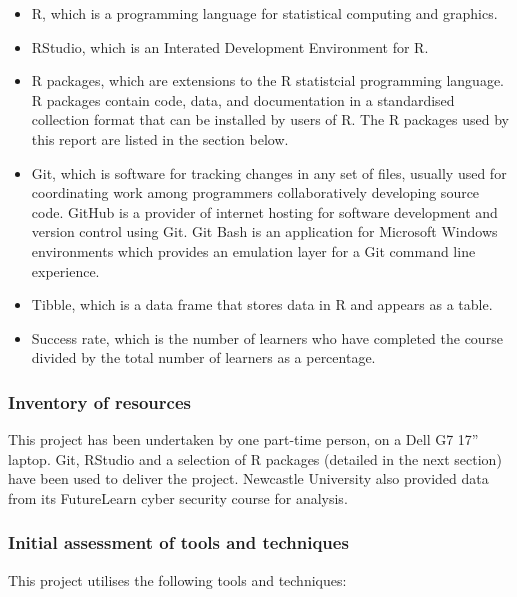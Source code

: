 \documentclass[
]{article}
\begin{document}
\begin{itemize}
\item
  R, which is a programming language for statistical computing and
  graphics.
\item
  RStudio, which is an Interated Development Environment for R.
\item
  R packages, which are extensions to the R statistcial programming
  language. R packages contain code, data, and documentation in a
  standardised collection format that can be installed by users of R.
  The R packages used by this report are listed in the section below.
\item
  Git, which is software for tracking changes in any set of files,
  usually used for coordinating work among programmers collaboratively
  developing source code. GitHub is a provider of internet hosting for
  software development and version control using Git. Git Bash is an
  application for Microsoft Windows environments which provides an
  emulation layer for a Git command line experience.
\item
  Tibble, which is a data frame that stores data in R and appears as a
  table.
\item
  Success rate, which is the number of learners who have completed the
  course divided by the total number of learners as a percentage.
\end{itemize}

\hypertarget{inventory-of-resources}{%
\subsubsection{Inventory of resources}\label{inventory-of-resources}}

This project has been undertaken by one part-time person, on a Dell G7
17'' laptop. Git, RStudio and a selection of R packages (detailed in the
next section) have been used to deliver the project. Newcastle
University also provided data from its FutureLearn cyber security course
for analysis.

\hypertarget{initial-assessment-of-tools-and-techniques}{%
\subsubsection{Initial assessment of tools and
techniques}\label{initial-assessment-of-tools-and-techniques}}

This project utilises the following tools and techniques:
\end{document}
